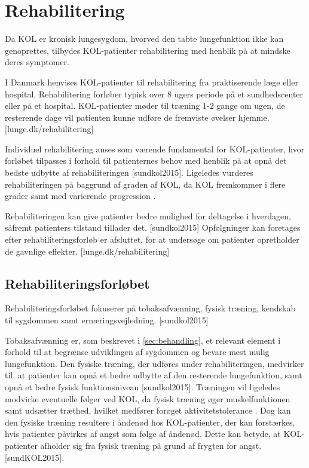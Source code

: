 \section{Rehabilitering}
Da KOL er kronisk lungesygdom, hvorved den tabte lungefunktion ikke kan genoprettes, tilbydes KOL-patienter rehabilitering med henblik på at mindske deres symptomer. 

I Danmark henvises KOL-patienter til rehabilitering fra praktiserende læge eller hospital. Rehabilitering forløber typisk over $8$ ugers periode på et sundhedscenter eller på et hospital. KOL-patienter møder til træning $1$-$2$ gange om ugen, de resterende dage vil patienten kunne udføre de fremviste øvelser hjemme. \cite{McCarthy2015}[lunge.dk/rehabilitering] 

Individuel rehabilitering anses som værende fundamental for KOL-patienter, hvor forløbet tilpasses i forhold til patienternes behov med henblik på at opnå det bedste udbytte af rehabiliteringen \cite{McCarthy2015,Habraken2011}[sundkol2015]. Ligeledes vurderes rehabiliteringen på baggrund af graden af KOL, da KOL fremkommer i flere grader samt med varierende progression \cite{McCarthy2015}. 

Rehabiliteringen kan give patienter bedre mulighed for deltagelse i hverdagen, såfremt patienters tilstand tillader det. \cite{McCarthy2015,Habraken2011} [sundkol2015] Opfølgninger kan foretages efter rehabiliteringsforløb er afsluttet, for at undersøge om patienter opretholder de gavnlige effekter. [lunge.dk/rehabilitering]


\subsection{Rehabiliteringsforløbet}
Rehabiliteringsforløbet fokuserer på tobaksafvænning, fysisk træning, kendskab til sygdommen samt ernæringsvejledning. \cite{McCarthy2015,Habraken2011} [sundkol2015] 

Tobaksafvænning er, som beskrevet i \autoref{sec:behandling}, et relevant element i forhold til at begrænse udviklingen af sygdommen og bevare mest mulig lungefunktion. Den fysiske træning, der udføres under rehabiliteringen, medvirker til, at patienter kan opnå et bedre udbytte af den resterende lungefunktion, samt opnå et bedre fysisk funktionsniveau [sundkol2015]. 
Træningen vil ligeledes modvirke eventuelle følger ved KOL, da fysisk træning øger muskelfunktionen samt udsætter træthed, hvilket medfører forøget aktivitetstolerance \cite{McCarthy2015}. Dog kan den fysiske træning resultere i åndenød hos KOL-patienter, der kan forstærkes, hvis patienter påvirkes af angst som følge af åndenød. Dette kan betyde, at KOL-patienter afholder sig fra fysisk træning på grund af frygten for angst. \cite{McCarthy2015} [sundKOL2015]. 


